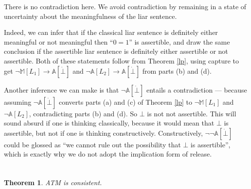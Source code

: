 \documentclass{amsart}
\newtheorem{theorem}{Theorem}[section]
\theoremstyle{definition}
\begin{document}
There is no contradiction here. We avoid contradiction by remaining in a state of uncertainty about the meaningfulness of the liar sentence.

Indeed, we can infer that if the classical liar sentence is definitely either meaningful or not meaningful then ``$0 = 1$'' is assertible, and draw the same conclusion if the assertible liar sentence is definitely either assertible or not assertible. Both of these statements follow from Theorem \ref{lp}, using capture to get $\neg\mathbb{M}[L_1] \to \mathbb{A}[\dot{\bot}]$ and $\neg\mathbb{A}[L_2] \to \mathbb{A}[\dot{\bot}]$ from parts (b) and (d).

Another inference we can make is that $\neg \mathbb{A}[\dot{\bot}]$ entails a contradiction --- because assuming $\neg\mathbb{A}[\dot{\bot}]$ converts parts (a) and (c) of Theorem \ref{lp} to $\neg\mathbb{M}[L_1]$ and $\neg\mathbb{A}[L_2]$, contradicting parts (b) and (d). So $\bot$ is not not assertible. This will sound absurd if one is thinking classically, because it would mean that $\bot$ is assertible, but not if one is thinking constructively. Constructively, $\neg\neg\mathbb{A}[\dot{\bot}]$ could be glossed as ``we cannot rule out the possibility that $\bot$ is assertible'', which is exactly why we do not adopt the implication form of release.

\section{}

\begin{theorem}\label{lpcons}
  ATM is consistent.
\end{theorem}
\end{document}
